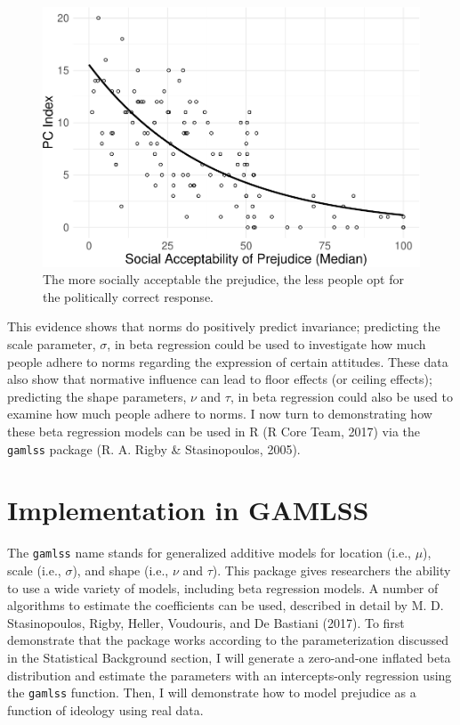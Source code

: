 \documentclass[english,man]{apa6}
\theoremstyle{definition}
\theoremstyle{definition}
\theoremstyle{remark}
\begin{document}
\begin{figure}
\centering
\includegraphics{beta_hurdle_files/figure-latex/unnamed-chunk-4-1.pdf}
\caption{\label{fig:unnamed-chunk-4}The more socially acceptable the
prejudice, the less people opt for the politically correct response.}
\end{figure}

This evidence shows that norms do positively predict invariance;
predicting the scale parameter, \(\sigma\), in beta regression could be
used to investigate how much people adhere to norms regarding the
expression of certain attitudes. These data also show that normative
influence can lead to floor effects (or ceiling effects); predicting the
shape parameters, \(\nu\) and \(\tau\), in beta regression could also be
used to examine how much people adhere to norms. I now turn to
demonstrating how these beta regression models can be used in R (R Core
Team, 2017) via the \texttt{gamlss} package (R. A. Rigby \&
Stasinopoulos, 2005).

\section{Implementation in GAMLSS}\label{implementation-in-gamlss}

The \texttt{gamlss} name stands for generalized additive models for
location (i.e., \(\mu\)), scale (i.e., \(\sigma\)), and shape (i.e.,
\(\nu\) and \(\tau\)). This package gives researchers the ability to use
a wide variety of models, including beta regression models. A number of
algorithms to estimate the coefficients can be used, described in detail
by M. D. Stasinopoulos, Rigby, Heller, Voudouris, and De Bastiani
(2017). To first demonstrate that the package works according to the
parameterization discussed in the Statistical Background section, I will
generate a zero-and-one inflated beta distribution and estimate the
parameters with an intercepts-only regression using the \texttt{gamlss}
function. Then, I will demonstrate how to model prejudice as a function
of ideology using real data.
\end{document}

